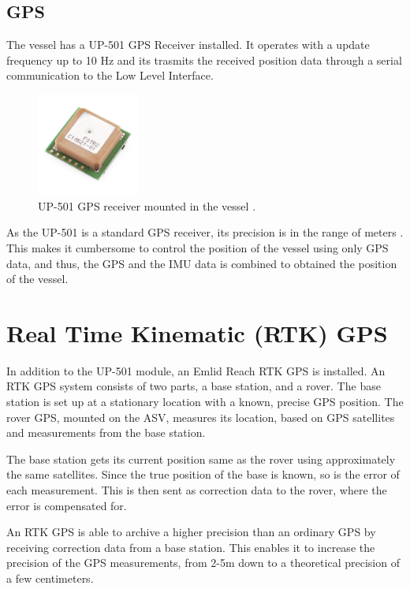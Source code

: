 \subsection{GPS}
The vessel has a UP-501 GPS Receiver installed. It operates with a update frequency up to 10 Hz and its trasmits the received position data through a serial communication to the Low Level Interface. \cite{GPS}
%
\begin{figure}[H]
	\includegraphics[width=0.3\textwidth]{figures/GPS}
	\caption{UP-501 GPS receiver mounted in the vessel \cite{GPS}.}
	\label{fig:GPS}
\end{figure}
%
As the UP-501 is a standard GPS receiver, its precision is in the range of meters . This makes it cumbersome to control the position of the vessel using only GPS data, and thus, the GPS and the IMU data is combined to obtained the position of the vessel.

\section{Real Time Kinematic (RTK) GPS}
In addition to the UP-501 module, an Emlid Reach RTK GPS is installed. 
An RTK GPS system consists of two parts, a base station, and a rover.
The base station is set up at a stationary location with a known, precise GPS position.
The rover GPS, mounted on the ASV, measures its location, based on GPS satellites and measurements from the base station.\cite{EmlidRTK}

The base station gets its current position same as the rover using approximately the same satellites. Since the true position of the base is known, so is the error of each measurement. This is then sent as correction data to the rover, where the error is compensated for.%

An RTK GPS is able to archive a higher precision than an ordinary GPS by receiving correction data from a base station.
This enables it to increase the precision of the GPS measurements, from 2-5m down to a theoretical precision of a few centimeters.\cite{EmlidRTK}

